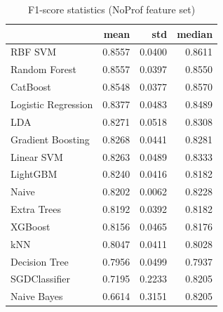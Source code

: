 \begin{table}
\caption{F1-score statistics (NoProf feature set)}
\label{tab:f1_NoProf_stats}
\begin{tabular}{lrrr}
\toprule
 & mean & std & median \\
\midrule
RBF SVM & 0.8557 & 0.0400 & 0.8611 \\
Random Forest & 0.8557 & 0.0397 & 0.8550 \\
CatBoost & 0.8548 & 0.0377 & 0.8570 \\
Logistic Regression & 0.8377 & 0.0483 & 0.8489 \\
LDA & 0.8271 & 0.0518 & 0.8308 \\
Gradient Boosting & 0.8268 & 0.0441 & 0.8281 \\
Linear SVM & 0.8263 & 0.0489 & 0.8333 \\
LightGBM & 0.8240 & 0.0416 & 0.8182 \\
Naive & 0.8202 & 0.0062 & 0.8228 \\
Extra Trees & 0.8192 & 0.0392 & 0.8182 \\
XGBoost & 0.8156 & 0.0465 & 0.8176 \\
kNN & 0.8047 & 0.0411 & 0.8028 \\
Decision Tree & 0.7956 & 0.0499 & 0.7937 \\
SGDClassifier & 0.7195 & 0.2233 & 0.8205 \\
Naive Bayes & 0.6614 & 0.3151 & 0.8205 \\
\bottomrule
\end{tabular}
\end{table}
